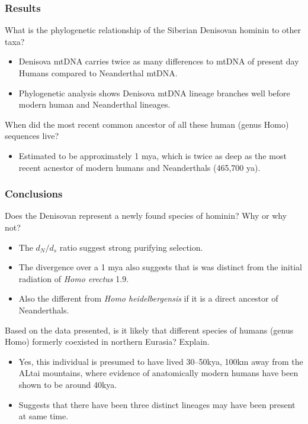 \documentclass[12pt,a4paper]{article}
\begin{document}
\subsubsection{Results}
\begin{itemize}
   {\color{G-Moon}\item What is the phylogenetic relationship of the Siberian Denisovan hominin to other taxa?}
        \begin{itemize}
            \item Denisova mtDNA carries twice as many differences to mtDNA of present day Humans compared to Neanderthal mtDNA. %
            \item Phylogenetic analysis shows Denisova mtDNA lineage branches well before modern human and Neanderthal lineages.
        \end{itemize}
   {\color{G-Moon}\item When did the most recent common ancestor of all these human (genus Homo) sequences live?}
        \begin{itemize}
            \item Estimated to be approximately 1 mya, which is twice as deep as the most recent acnestor of modern humans and Neanderthals (465,700 ya).
        \end{itemize}
\end{itemize}
\subsubsection{Conclusions}
\begin{itemize}
    {\color{G-Moon}\item Does the Denisovan represent a newly found species of hominin? Why or why not?}
        \begin{itemize}
            \item The \(d_N/d_s\) ratio suggest strong purifying selection.
            \item The divergence over a 1 mya also suggests that is was distinct from the initial radiation of \textit{Homo erectus} 1.9.
            \item Also the different from \textit{Homo heidelbergensis} if it is a direct ancestor of Neanderthals.
        \end{itemize}
    {\color{G-Moon}\item Based on the data presented, is it likely that different species of humans (genus Homo) formerly coexisted in northern Eurasia? Explain.}
        \begin{itemize}
            \item Yes, this individual is presumed to have lived 30--50kya, 100km away from the ALtai mountains, where evidence of anatomically modern humans have been shown to be around 40kya. 
            \item Suggests that there have been three distinct lineages may have been present at same time. 
        \end{itemize}
\end{itemize}
\end{document}

